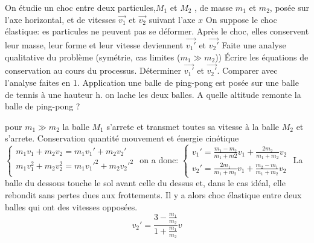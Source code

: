 \begin{Exercise}[title=Chocs]
  On étudie un choc entre deux particules,$ M_1$ et $M_2$ , de masse $m_1$ et $m_2$, posée sur l'axe horizontal,
  et de vitesses $\vec{v_1}$ et $\vec{v_2}$ suivant l'axe $x$
On suppose le choc élastique:
es particules ne peuvent pas se déformer. Après le choc, elles conservent leur
masse, leur forme et leur vitesse deviennent $\vec{v_1'}$ et $\vec{v_2'}$
\Question Faite une analyse qualitative du problème (symétrie, cas limites
($m_1\gg m_2$))
\Question Écrire les équations de conservation au cours du processus.
\Question Déterminer $\vec{v_1'}$ et $\vec{v_2'}$. Comparer avec l'analyse faites
en 1.
\Question Application une balle de ping-pong est posée sur une balle de tennis à
une hauteur h. on lache les deux balles. A quelle altitude remonte la balle de
ping-pong ?
\end{Exercise}
\begin{Answer}
  \Question pour $m_1\gg m_2$ la balle $M_1$ s'arrete et transmet toutes sa vitesse
  à la balle $M_2$ et s'arrete.
  \Question  Conservation quantité mouvement et énergie cinétique
$  \begin{cases}
    m_1v_1 + m_2v_2 = m_1v_1'+m_2v_2' \\
    m_1v_1^2+m_2v_2^2 = m_1v_1'^2+m_2v_2'^2 \\
  \end{cases}$
  \Question on a donc:
  $\begin{cases}
    v_1' = \frac{m_1-m_2}{m_1+m2}v_1+\frac{2m_2}{m_1+m_2}v_2\\
    v_2' = \frac{2m_1}{m_1+m_2}v_1+\frac{m_2-m_1}{m_1+m_2}v_2
  \end{cases}$
  \Question La balle du dessous touche le sol avant celle du dessus et, dans le
  cas idéal, elle rebondit sans pertes dues aux frottements.
  Il y a alors choc élastique entre deux balles qui ont
  des vitesses opposées.
  $$v_2'=\frac{3-\frac{m_1}{m_2}}{1+\frac{m_1}{m_2}}v $$
\end{Answer}
